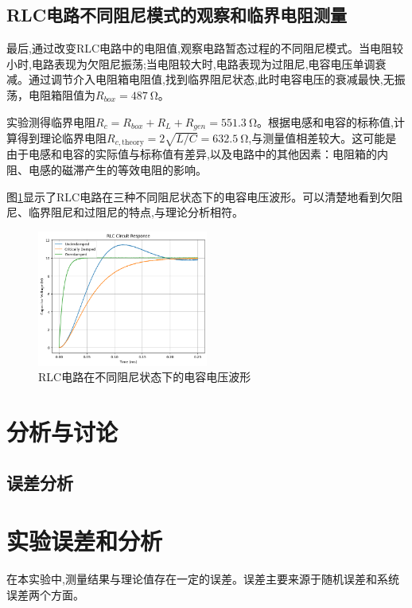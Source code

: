\documentclass[UTF8]{ctexart}
\begin{document}
\subsection{RLC电路不同阻尼模式的观察和临界电阻测量}

最后,通过改变RLC电路中的电阻值,观察电路暂态过程的不同阻尼模式。当电阻较小时,电路表现为欠阻尼振荡;当电阻较大时,电路表现为过阻尼,电容电压单调衰减。通过调节介入电阻箱电阻值,找到临界阻尼状态,此时电容电压的衰减最快,无振荡，电阻箱阻值为$R_{box}=\SI{487}{\ohm}$。

实验测得临界电阻$R_c =R_{box} +R_{L}+R_{gen}= \SI{551.3}{\ohm}$。根据电感和电容的标称值,计算得到理论临界电阻$R_{c,\text{theory}} = 2\sqrt{L/C} = \SI{632.5}{\ohm}$,与测量值相差较大。这可能是由于电感和电容的实际值与标称值有差异,以及电路中的其他因素：电阻箱的内阻、电感的磁滞产生的等效电阻的影响。

图\ref{fig:rlc_damping}显示了RLC电路在三种不同阻尼状态下的电容电压波形。可以清楚地看到欠阻尼、临界阻尼和过阻尼的特点,与理论分析相符。

\begin{figure}[htbp]
    \centering
    \includegraphics[width=0.5\textwidth]{rlc_damping.png}
    \caption{RLC电路在不同阻尼状态下的电容电压波形}
    \label{fig:rlc_damping}
\end{figure}
\section{分析与讨论}

\subsection{误差分析}
\section{实验误差和分析}

在本实验中,测量结果与理论值存在一定的误差。误差主要来源于随机误差和系统误差两个方面。
\end{document}
